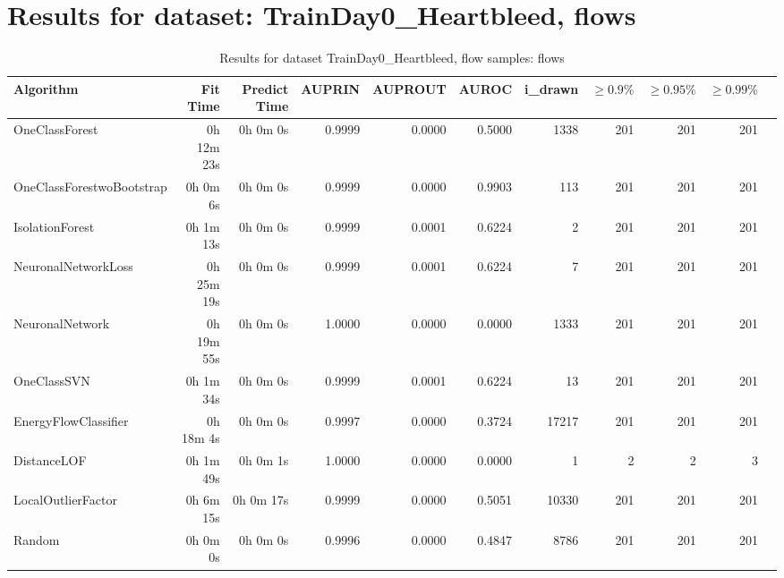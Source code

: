 \documentclass{article}
\begin{document}
\section*{Results for dataset: TrainDay0_Heartbleed, flows}
\begin{table}[h!]
\centering
\caption{Results for dataset TrainDay0_Heartbleed, flow samples: flows}
\begin{tabular}{lrrrrrrrrrr}
\toprule
Algorithm & Fit Time & Predict Time & AUPRIN & AUPROUT & AUROC & i\_drawn & $\geq 0.9\%$ & $\geq 0.95\%$ & $\geq 0.99\%$ \\
\midrule
OneClassForest & 0h 12m 23s & 0h 0m 0s & 0.9999 & 0.0000 & 0.5000 & 1338 & 201 & 201 & 201 \\
OneClassForestwoBootstrap & 0h 0m 6s & 0h 0m 0s & 0.9999 & 0.0000 & 0.9903 & 113 & 201 & 201 & 201 \\
IsolationForest & 0h 1m 13s & 0h 0m 0s & 0.9999 & 0.0001 & 0.6224 & 2 & 201 & 201 & 201 \\
NeuronalNetworkLoss & 0h 25m 19s & 0h 0m 0s & 0.9999 & 0.0001 & 0.6224 & 7 & 201 & 201 & 201 \\
NeuronalNetwork & 0h 19m 55s & 0h 0m 0s & 1.0000 & 0.0000 & 0.0000 & 1333 & 201 & 201 & 201 \\
OneClassSVN & 0h 1m 34s & 0h 0m 0s & 0.9999 & 0.0001 & 0.6224 & 13 & 201 & 201 & 201 \\
EnergyFlowClassifier & 0h 18m 4s & 0h 0m 0s & 0.9997 & 0.0000 & 0.3724 & 17217 & 201 & 201 & 201 \\
DistanceLOF & 0h 1m 49s & 0h 0m 1s & 1.0000 & 0.0000 & 0.0000 & 1 & 2 & 2 & 3 \\
LocalOutlierFactor & 0h 6m 15s & 0h 0m 17s & 0.9999 & 0.0000 & 0.5051 & 10330 & 201 & 201 & 201 \\
Random & 0h 0m 0s & 0h 0m 0s & 0.9996 & 0.0000 & 0.4847 & 8786 & 201 & 201 & 201 \\
\bottomrule
\end{tabular}
\end{table}
\end{document}
